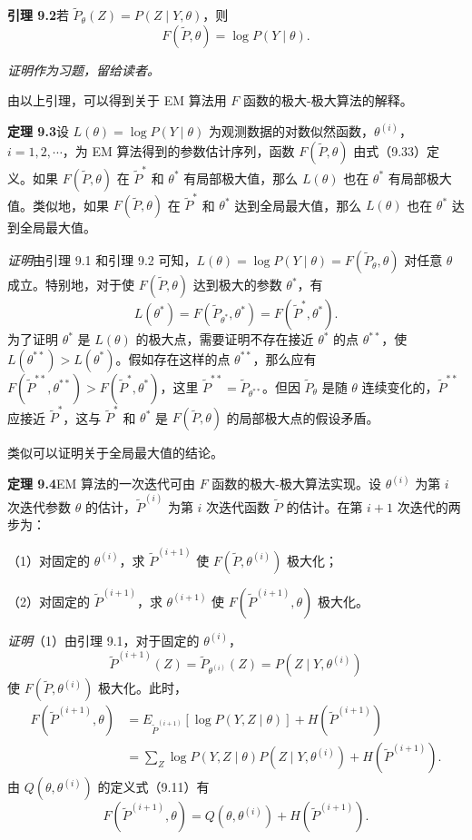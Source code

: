\documentclass[UTF8,12pt,a4paper,fontset=fandol]{ctexart}
\begin{document}
\noindent\textbf{引理 9.2}\quad 若 $\tilde{P}_{\theta}(Z)=P(Z\mid Y,\theta)$，则
\begin{equation}
  F(\tilde{P},\theta)=\log P(Y\mid\theta).
  \tag{9.36}
\end{equation}

\noindent\textit{证明作为习题，留给读者。}

由以上引理，可以得到关于 EM 算法用 $F$ 函数的极大-极大算法的解释。

\noindent\textbf{定理 9.3}\quad 设 $L(\theta)=\log P(Y\mid\theta)$ 为观测数据的对数似然函数，$\theta^{(i)}$，$i=1,2,\cdots$，为 EM 算法得到的参数估计序列，函数 $F(\tilde{P},\theta)$ 由式（9.33）定义。如果 $F(\tilde{P},\theta)$ 在 $\tilde{P}^*$ 和 $\theta^*$ 有局部极大值，那么 $L(\theta)$ 也在 $\theta^*$ 有局部极大值。类似地，如果 $F(\tilde{P},\theta)$ 在 $\tilde{P}^*$ 和 $\theta^*$ 达到全局最大值，那么 $L(\theta)$ 也在 $\theta^*$ 达到全局最大值。

\noindent\textit{证明}\quad 由引理 9.1 和引理 9.2 可知，$L(\theta)=\log P(Y\mid\theta)=F(\tilde{P}_{\theta},\theta)$ 对任意 $\theta$ 成立。特别地，对于使 $F(\tilde{P},\theta)$ 达到极大的参数 $\theta^*$，有
\begin{equation}
  L(\theta^*)=F(\tilde{P}_{\theta^*},\theta^*)=F(\tilde{P}^*,\theta^*).
  \tag{9.37}
\end{equation}
为了证明 $\theta^*$ 是 $L(\theta)$ 的极大点，需要证明不存在接近 $\theta^*$ 的点 $\theta^{**}$，使 $L(\theta^{**})>L(\theta^*)$。假如存在这样的点 $\theta^{**}$，那么应有 $F(\tilde{P}^{**},\theta^{**})>F(\tilde{P}^*,\theta^*)$，这里 $\tilde{P}^{**}=\tilde{P}_{\theta^{**}}$。但因 $\tilde{P}_{\theta}$ 是随 $\theta$ 连续变化的，$\tilde{P}^{**}$ 应接近 $\tilde{P}^*$，这与 $\tilde{P}^*$ 和 $\theta^*$ 是 $F(\tilde{P},\theta)$ 的局部极大点的假设矛盾。

类似可以证明关于全局最大值的结论。

\noindent\textbf{定理 9.4}\quad EM 算法的一次迭代可由 $F$ 函数的极大-极大算法实现。设 $\theta^{(i)}$ 为第 $i$ 次迭代参数 $\theta$ 的估计，$\tilde{P}^{(i)}$ 为第 $i$ 次迭代函数 $\tilde{P}$ 的估计。在第 $i+1$ 次迭代的两步为：

（1）对固定的 $\theta^{(i)}$，求 $\tilde{P}^{(i+1)}$ 使 $F(\tilde{P},\theta^{(i)})$ 极大化；

（2）对固定的 $\tilde{P}^{(i+1)}$，求 $\theta^{(i+1)}$ 使 $F(\tilde{P}^{(i+1)},\theta)$ 极大化。

\noindent\textit{证明}\quad （1）由引理 9.1，对于固定的 $\theta^{(i)}$，
\[
  \tilde{P}^{(i+1)}(Z)=\tilde{P}_{\theta^{(i)}}(Z)=P(Z\mid Y,\theta^{(i)})
\]
使 $F(\tilde{P},\theta^{(i)})$ 极大化。此时，
\[
\begin{aligned}
  F(\tilde{P}^{(i+1)},\theta)
  &=E_{\tilde{P}^{(i+1)}}[\log P(Y,Z\mid\theta)]+H(\tilde{P}^{(i+1)})\\
  &=\sum_Z \log P(Y,Z\mid\theta)P(Z\mid Y,\theta^{(i)})
  +H(\tilde{P}^{(i+1)}).
\end{aligned}
\]
由 $Q(\theta,\theta^{(i)})$ 的定义式（9.11）有
\[
  F(\tilde{P}^{(i+1)},\theta)=Q(\theta,\theta^{(i)})+H(\tilde{P}^{(i+1)}).
\]
\end{document}
